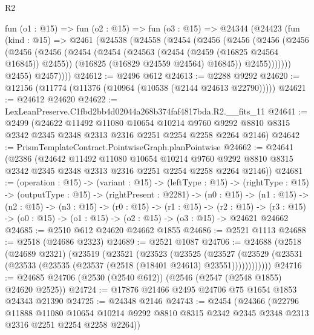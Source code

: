 \begin{lexlean}{R2}
\begin{coremodule}
  fun (o1 : @15) =>
  fun (o2 : @15) =>
  fun (o3 : @15) =>
  @24344
    (@24423
      (fun (kind : @15) =>
      @2461
        (@24538
          (@24558
            (@2454
              (@2456
                (@2456
                  (@2456
                    (@2456
                      (@2456
                        (@2456
                          (@2454
                            (@2454
                              (@24563 (@2454 (@2459 (@16825 @24564 @16845)) @2455))
                              (@16825 (@16829 @24559 @24564) @16845))
                            @2455)))))))
              @2455)
            @2457))))
@24612 := @2496 @612
@24613 := @2288 @9292
@24620 := @12156 (@11774 (@11376 (@10964 (@10538 (@2144 @24613 @22790)))))
@24621 := @24612 @24620
@24622 := LexLeanPreserve.C1fbd2bb4d02044a268b374faf4817bda.R2.__fits_11
@24641 := @2499
    (@24622
      @11492
      @11080
      @10654
      @10214
      @9760
      @9292
      @8810
      @8315
      @2342
      @2345
      @2348
      @2313
      @2316
      @2251
      @2254
      @2258
      @2264
      @2146)
@24642 := PrismTemplateContract.PointwiseGraph.planPointwise
@24662 := @24641
    (@2386
      (@24642
        @11492
        @11080
        @10654
        @10214
        @9760
        @9292
        @8810
        @8315
        @2342
        @2345
        @2348
        @2313
        @2316
        @2251
        @2254
        @2258
        @2264
        @2146))
@24681 := (operation : @15) ->
  (variant : @15) ->
  (leftType : @15) ->
  (rightType : @15) ->
  (outputType : @15) ->
  (rightPresent : @2281) ->
  (n0 : @15) ->
  (n1 : @15) ->
  (n2 : @15) ->
  (n3 : @15) ->
  (r0 : @15) ->
  (r1 : @15) ->
  (r2 : @15) -> (r3 : @15) -> (o0 : @15) -> (o1 : @15) -> (o2 : @15) -> (o3 : @15) -> @24621 @24662
@24685 := @2510 @612 @24620 @24662 @1855
@24686 := @2521 @1113
@24688 := @2518 (@24686 @2323)
@24689 := @2521 @1087
@24706 := @24688
    (@2518
      (@24689 @2321)
      (@23519
        (@23521
          (@23523
            (@23525
              (@23527
                (@23529 (@23531 (@23533 (@23535 (@23537 (@2518 (@18401 @24613) @23551))))))))))))
@24716 := @24685 @24706 (@2530 (@2540 @612)) (@2546 (@2547 (@2548 @1855) @24620 @2525))
@24724 := @17876 @21466 @2495 @24706 @75 @1654 @1853 @24343 @21390
@24725 := @24348 @2146
@24743 := @2454
    (@24366
      (@22796
        @11888
        @11080
        @10654
        @10214
        @9292
        @8810
        @8315
        @2342
        @2345
        @2348
        @2313
        @2316
        @2251
        @2254
        @2258
        @2264))

\end{coremodule}
\end{lexlean}
